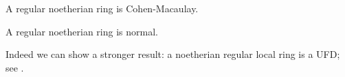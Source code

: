     \begin{corollary}\label{cor: regular ring is Cohen-Macaulay}
        A regular noetherian ring is Cohen-Macaulay.
    \end{corollary}

    \begin{corollary}\label{cor: regular ring is normal}
        A regular noetherian ring is normal.
    \end{corollary}

    \begin{remark}
        Indeed we can show a stronger result: a noetherian regular local ring is a UFD; see .
    \end{remark}



        






